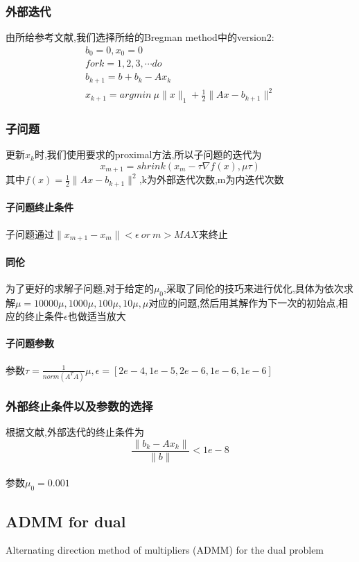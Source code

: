 \documentclass[UTF8]{ctexart}
\begin{document}
   \subsubsection{外部迭代}
   由所给参考文献,我们选择所给的Bregman method中的version2:
         \begin{equation}
    \begin{split}
    b_0=0, x_0=0 \\
    for k = 1,2,3,\cdots do \\
    b_{k+1} = b + b_k - Ax_k \\
    x_{k+1} = argmin\ \mu \|x\|_1 + \frac{1}{2}\|Ax-b_{k+1}\|^2
    \end{split}
  \end{equation}
  \subsubsection{子问题}
  更新$x_k$时,我们使用要求的proximal方法,所以子问题的迭代为
  $$
  x_{ m+1}=shrink(x_m-\tau \nabla f(x),\mu \tau)
  $$
  其中$f(x)=\frac{1}{2}\|Ax-b_{k+1}\|^2$,k为外部迭代次数,m为内迭代次数
  \paragraph{子问题终止条件}
  子问题通过$\|x_{m+1}-x_m\|<\epsilon\ or\ m > MAX$来终止
  \paragraph{同伦}
  为了更好的求解子问题,对于给定的$\mu_0$,采取了同伦的技巧来进行优化,具体为依次求解$\mu =10000\mu,1000\mu,100\mu,10\mu,\mu$对应的问题,然后用其解作为下一次的初始点,相应的终止条件$\epsilon$也做适当放大
  \paragraph{子问题参数}
  参数$\tau = \frac{1}{norm(A^TA)}\mu,\epsilon= [2e-4,1e-5,2e-6,1e-6,1e-6]$
  \subsubsection{外部终止条件以及参数的选择}
  根据文献,外部迭代的终止条件为
  $$
  \frac{\|b_k-Ax_k\|}{\|b\|}<1e-8
  $$
  \paragraph{}
  参数$\mu_0=0.001$



  \subsection{ADMM for dual}
   Alternating direction method of multipliers (ADMM) for the dual problem
\end{document}
